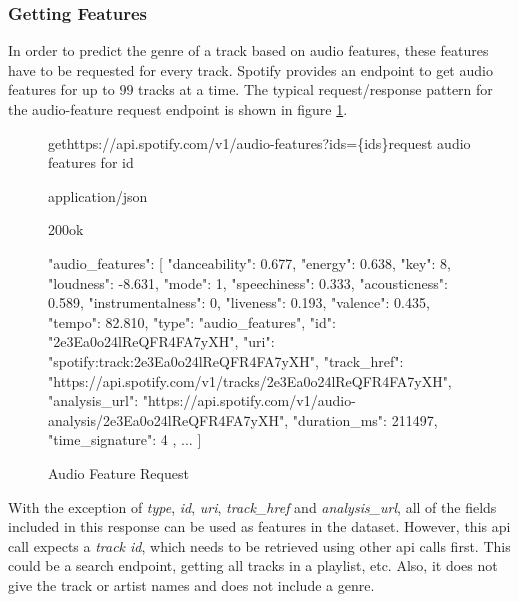 \subsubsection{Getting Features}

In order to predict the genre of a track based on audio features, these features have to be requested
for every track. Spotify provides an endpoint to get audio features for up to $99$ tracks at a time.
The typical request/response pattern for the audio-feature request endpoint is shown in figure \ref{fig:Audio Feature Request}.

\begin{figure}[H]
    \caption{Audio Feature Request}
	\label{fig:Audio Feature Request}
\begin{apiRoute}{get}{https://api.spotify.com/v1/audio-features?ids=\{ids\}}{request audio features for id}
    \methodJson
    \begin{routeParameter}
    \end{routeParameter}
    \begin{routeResponse}{application/json}
        \begin{routeResponseItem}{200}{ok}
            \begin{routeResponseItemBody}
{
    "audio_features": [
        {
            "danceability": 0.677,
            "energy": 0.638,
            "key": 8,
            "loudness": -8.631,
            "mode": 1,
            "speechiness": 0.333,
            "acousticness": 0.589,
            "instrumentalness": 0,
            "liveness": 0.193,
            "valence": 0.435,
            "tempo": 82.810,
            "type": "audio_features",
            "id": "2e3Ea0o24lReQFR4FA7yXH",
            "uri": "spotify:track:2e3Ea0o24lReQFR4FA7yXH",
            "track_href": "https://api.spotify.com/v1/tracks/2e3Ea0o24lReQFR4FA7yXH",
            "analysis_url": "https://api.spotify.com/v1/audio-analysis/2e3Ea0o24lReQFR4FA7yXH",
            "duration_ms": 211497,
            "time_signature": 4
        },
        ...
    ]
}
            \end{routeResponseItemBody}
        \end{routeResponseItem}
    \end{routeResponse}
\end{apiRoute}
\end{figure}

With the exception of \emph{type}, \emph{id}, \emph{uri}, \emph{track\_href} and \emph{analysis\_url}, all of the fields included in this response
can be used as features in the dataset. However, this api call expects a \emph{track id}, which needs to be retrieved using
other api calls first. This could be a search endpoint, getting all tracks in a playlist, etc.
Also, it does not give the track or artist names and does not include a genre.

